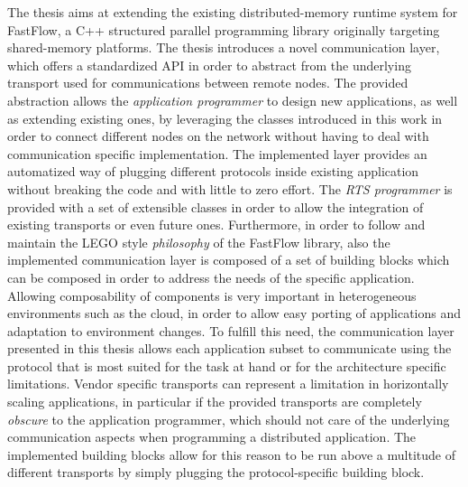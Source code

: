 \documentclass[12pt, oneside]{report}
\begin{document}
The thesis aims at extending the existing distributed-memory runtime system for FastFlow, a C++ structured parallel programming library originally targeting shared-memory platforms. The thesis introduces a novel communication layer, which offers a standardized API in order to abstract from the underlying transport used for communications between remote nodes. The provided abstraction allows the \textit{application programmer} to design new applications, as well as extending existing ones, by leveraging the classes introduced in this work in order to connect different nodes on the network without having to deal with communication specific implementation. The implemented layer provides an automatized way of plugging different protocols inside existing application without breaking the code and with little to zero effort. The \textit{RTS programmer} is provided with a set of extensible classes in order to allow the integration of existing transports or even future ones. Furthermore, in order to follow and maintain the LEGO style \textit{philosophy} of the FastFlow library, also the implemented communication layer is composed of a set of building blocks which can be composed in order to address the needs of the specific application. Allowing composability of components is very important in heterogeneous environments such as the cloud, in order to allow easy porting of applications and adaptation to environment changes. To fulfill this need, the communication layer presented in this thesis allows each application subset to communicate using the protocol that is most suited for the task at hand or for the architecture specific limitations. Vendor specific transports can represent a limitation in horizontally scaling applications, in particular if the provided transports are completely \textit{obscure} to the application programmer, which should not care of the underlying communication aspects when programming a distributed application. The implemented building blocks allow for this reason to be run above a multitude of different transports by simply plugging the protocol-specific building block.\newline
\end{document}
